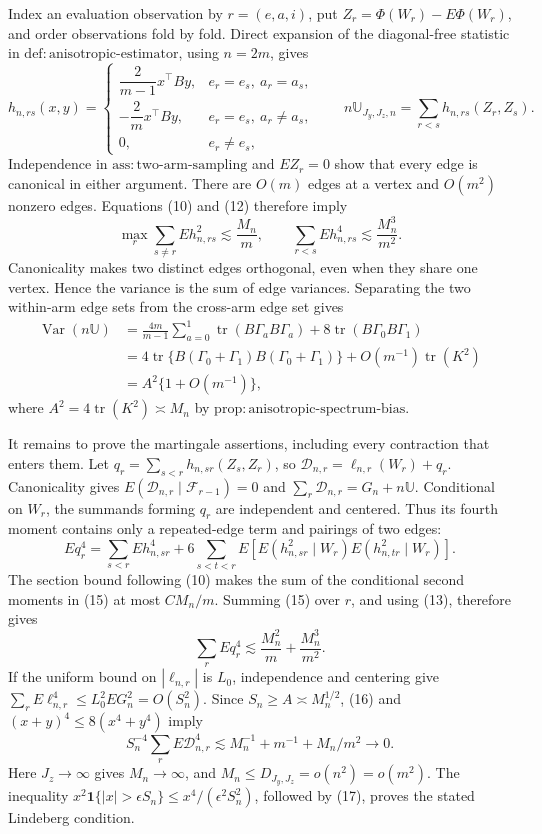 Index an evaluation observation by \(r=(e,a,i)\), put \(Z_r=\Phi(W_r)-E\Phi(W_r)\), and order observations fold by fold.  Direct expansion of the diagonal-free statistic in \(\mathrm{def{:}anisotropic\text{-}estimator}\), using \(n=2m\), gives
\[
h_{n,rs}(x,y)=
\begin{cases}
\dfrac{2}{m-1}x^{\top}By,&e_r=e_s,\ a_r=a_s,\\[4pt]
-\dfrac{2}{m}x^{\top}By,&e_r=e_s,\ a_r\ne a_s,\\[4pt]
0,&e_r\ne e_s,
\end{cases}
\qquad
n\mathbb U_{J_y,J_z,n}=\sum_{r<s}h_{n,rs}(Z_r,Z_s).
\tag{12}
\]
Independence in \(\mathrm{ass{:}two\text{-}arm\text{-}sampling}\) and \(EZ_r=0\) show that every edge is canonical in either argument.  There are \(O(m)\) edges at a vertex and \(O(m^2)\) nonzero edges.  Equations (10) and (12) therefore imply
\[
\max_r\sum_{s\ne r}Eh_{n,rs}^2\lesssim\frac{M_n}{m},
\qquad
\sum_{r<s}Eh_{n,rs}^4\lesssim\frac{M_n^3}{m^2}.
\tag{13}
\]
Canonicality makes two distinct edges orthogonal, even when they share one vertex.  Hence the variance is the sum of edge variances.  Separating the two within-arm edge sets from the cross-arm edge set gives
\[
\begin{split}
\operatorname{Var}(n\mathbb U)
&=\frac{4m}{m-1}\sum_{a=0}^1\operatorname{tr}(B\Gamma_aB\Gamma_a)
+8\operatorname{tr}(B\Gamma_0B\Gamma_1)\\
&=4\operatorname{tr}\{B(\Gamma_0+\Gamma_1)B(\Gamma_0+\Gamma_1)\}
+O(m^{-1})\operatorname{tr}(K^2)\\
&=A^2\{1+O(m^{-1})\},
\end{split}
\tag{14}
\]
where \(A^2=4\operatorname{tr}(K^2)\asymp M_n\) by \(\mathrm{prop{:}anisotropic\text{-}spectrum\text{-}bias}\).

It remains to prove the martingale assertions, including every contraction that enters them.  Let
\(q_r=\sum_{s<r}h_{n,sr}(Z_s,Z_r)\), so \(\mathcal D_{n,r}=\ell_{n,r}(W_r)+q_r\).  Canonicality gives
\(E(\mathcal D_{n,r}\mid\mathcal F_{r-1})=0\) and
\(\sum_r\mathcal D_{n,r}=G_n+n\mathbb U\).  Conditional on \(W_r\), the summands forming \(q_r\) are independent and centered.  Thus its fourth moment contains only a repeated-edge term and pairings of two edges:
\[
Eq_r^4
=\sum_{s<r}Eh_{n,sr}^4
+6\sum_{s<t<r}E\!\left[E(h_{n,sr}^2\mid W_r)E(h_{n,tr}^2\mid W_r)\right].
\tag{15}
\]
The section bound following (10) makes the sum of the conditional second moments in (15) at most \(CM_n/m\).  Summing (15) over \(r\), and using (13), therefore gives
\[
\sum_rEq_r^4\lesssim \frac{M_n^2}{m}+\frac{M_n^3}{m^2}.
\tag{16}
\]
If the uniform bound on \(|\ell_{n,r}|\) is \(L_0\), independence and centering give
\(\sum_rE\ell_{n,r}^4\le L_0^2EG_n^2=O(S_n^2)\).  Since \(S_n\ge A\asymp M_n^{1/2}\), (16) and \((x+y)^4\le8(x^4+y^4)\) imply
\[
S_n^{-4}\sum_rE\mathcal D_{n,r}^4
\lesssim M_n^{-1}+m^{-1}+M_n/m^2\longrightarrow0.
\tag{17}
\]
Here \(J_z\to\infty\) gives \(M_n\to\infty\), and \(M_n\le D_{J_y,J_z}=o(n^2)=o(m^2)\).  The inequality
\(x^2\mathbf1\{|x|>\epsilon S_n\}\le x^4/(\epsilon^2S_n^2)\), followed by (17), proves the stated Lindeberg condition.

